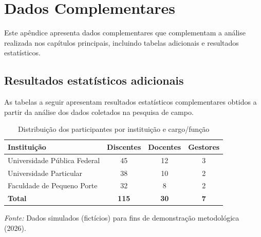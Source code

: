 \documentclass[12pt,a4paper,twoside,openright]{book}
\begin{document}
\chapter{Dados Complementares}
\label{apx:dados}

Este apêndice apresenta dados complementares que complementam a análise realizada nos capítulos principais, incluindo tabelas adicionais e resultados estatísticos.

\section{Resultados estatísticos adicionais}
\label{sec:resultados_adicionais}

As tabelas a seguir apresentam resultados estatísticos complementares obtidos a partir da análise dos dados coletados na pesquisa de campo.

\begin{table}[htbp]
    \centering
    \caption{Distribuição dos participantes por instituição e cargo/função}
    \label{tab:distribuicao_participantes}
    \small
    \begin{tabular}{lccc}
        \toprule
        \textbf{Instituição} & \textbf{Discentes} & \textbf{Docentes} & \textbf{Gestores} \\
        \midrule
        Universidade Pública Federal & 45 & 12 & 3 \\
        Universidade Particular & 38 & 10 & 2 \\
        Faculdade de Pequeno Porte & 32 & 8 & 2 \\
        \midrule
        \textbf{Total} & \textbf{115} & \textbf{30} & \textbf{7} \\
        \bottomrule
    \end{tabular}
    \par\medskip
    \footnotesize{\textit{Fonte:} Dados simulados (fictícios) para fins de demonstração metodológica (2026).}
\end{table}
\end{document}
